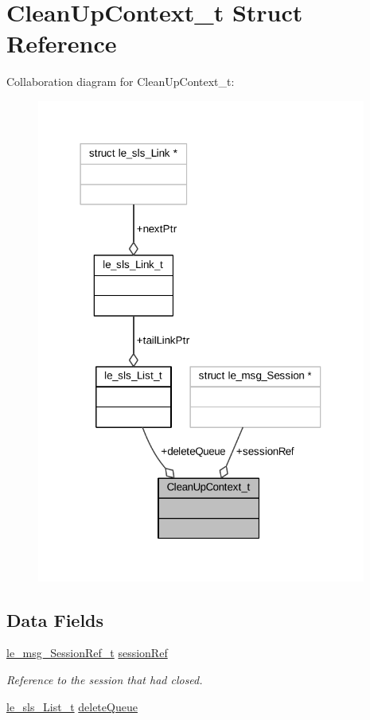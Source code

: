 \hypertarget{struct_clean_up_context__t}{}\section{Clean\+Up\+Context\+\_\+t Struct Reference}
\label{struct_clean_up_context__t}


Collaboration diagram for Clean\+Up\+Context\+\_\+t\+:
\nopagebreak
\begin{figure}[H]
\begin{center}
\leavevmode
\includegraphics[width=307pt]{struct_clean_up_context__t__coll__graph}
\end{center}
\end{figure}
\subsection*{Data Fields}
\begin{DoxyCompactItemize}
\item 
\hyperlink{le__messaging_8h_aebfc01e15b430a5b4f3038a5bd518904}{le\+\_\+msg\+\_\+\+Session\+Ref\+\_\+t} \hyperlink{struct_clean_up_context__t_a68aabd50871165a106b66c4fd2862a22}{session\+Ref}
\begin{DoxyCompactList}\small\item\em Reference to the session that had closed. \end{DoxyCompactList}\item 
\hyperlink{structle__sls___list__t}{le\+\_\+sls\+\_\+\+List\+\_\+t} \hyperlink{struct_clean_up_context__t_a9ab1d3978df13ae34fc268b5cefb4fdd}{delete\+Queue}
\end{DoxyCompactItemize}


